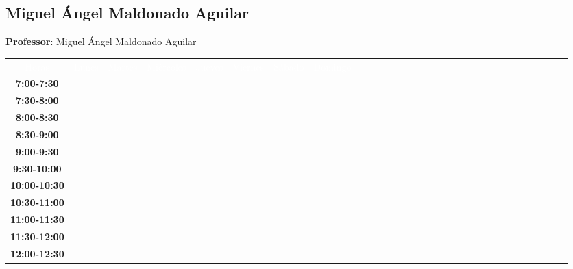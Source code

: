 \documentclass{article}
\begin{document}
        \newpage
        

        \subsection{Miguel \'Angel Maldonado Aguilar}
        \vspace*{.1cm}
        
        \begin{flushright}
            {\LARGE \textbf{Professor}: Miguel \'Angel Maldonado Aguilar}
        \end{flushright}
        \vspace{1cm}

        \begin{table}[ht]\centering\small\begin{tabular}{|c|c|c|c|c|c|c|c|c|c|c|c|c|c|c|c|c|c|c|c|c|c|c|c|c|c|c|c|c|c|}\hline\cellcolor{black}\textcolor{white}{Horas} & \cellcolor{black}\textcolor{white}{Lunes} & \cellcolor{black}\textcolor{white}{Martes} & \cellcolor{black}\textcolor{white}{Mi\'ercoles} & \cellcolor{black}\textcolor{white}{Jueves} & \cellcolor{black}\textcolor{white}{Viernes} & \cellcolor{black}\textcolor{white}{S\'abado} & \cellcolor{black}\textcolor{white}{Domingo} \\
 \cline{1-8} 
\textbf{7:00-7:30} &   &   &   &   &   &   &   \\
 \cline{1-8} 
\textbf{7:30-8:00} &   &   &   &   &   &   &   \\
 \cline{1-8} 
\textbf{8:00-8:30} &   &   &   &   &   &   &   \\
 \cline{1-8} 
\textbf{8:30-9:00} &   &   &   &   &   &   &   \\
 \cline{1-8} 
\textbf{9:00-9:30} &   &   &   &   &   &   &   \\
 \cline{1-8} 
\textbf{9:30-10:00} &   &   &   &   &   &   &   \\
 \cline{1-8} 
\textbf{10:00-10:30} &   &   &   &   &   &   &   \\
 \cline{1-8} 
\textbf{10:30-11:00} &   &   &   &   &   &   &   \\
 \cline{1-8} 
\textbf{11:00-11:30} &   &   &   &   &   &   &   \\
 \cline{1-8} 
\textbf{11:30-12:00} & \cellcolor[RGB]{170,5,63} &   &   & \cellcolor[RGB]{170,5,63} &   &   &   \\
 \cline{1-1} \cline{3-4} \cline{6-8} 
\textbf{12:00-12:30} & \cellcolor[RGB]{170,5,63} &   &   & \cellcolor[RGB]{170,5,63} &   &   &   \\
 \cline{1-1} \cline{3-4} \cline{6-8} 

\end{tabular}
\end{table}
\end{document}
